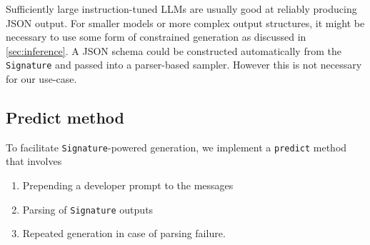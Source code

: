 Sufficiently large instruction-tuned LLMs are usually good at reliably producing JSON output.
For smaller models or more complex output structures, it might be necessary to use some form of constrained generation as discussed in \ref{sec:inference}.
A JSON schema could be constructed automatically from the \texttt{Signature} and passed into a parser-based sampler.
However this is not necessary for our use-case.
\subsection{Predict method}
To facilitate \texttt{Signature}-powered generation, we implement a \texttt{predict} method that involves
\begin{enumerate}
    \item Prepending a developer prompt to the messages
    \item Parsing of \texttt{Signature} outputs
    \item Repeated generation in case of parsing failure.
\end{enumerate}
\newpage

